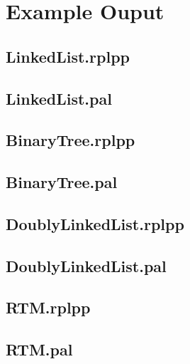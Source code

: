 \chapter{Example Ouput}
\label{app:example-output}

\section*{LinkedList.rplpp}


\newpage
\section*{LinkedList.pal}


\newpage
\section*{BinaryTree.rplpp}


\newpage
\section*{BinaryTree.pal}


\newpage
\section*{DoublyLinkedList.rplpp}


\newpage
\section*{DoublyLinkedList.pal}
   

\newpage
\section*{RTM.rplpp}


\newpage
\section*{RTM.pal}
 
